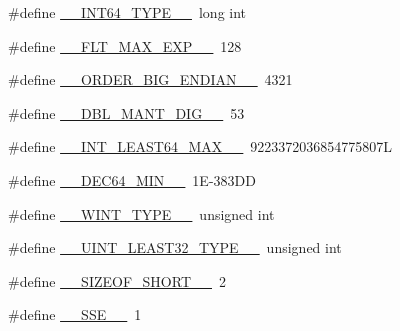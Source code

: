 \begin{DoxyCompactItemize}
\item 
\#define \hyperlink{build-analizer__host-_desktop___qt__5__9__0___g_c_c__64bit-_release_2moc__predefs_8h_a690dd4c0c7711687e30418f5e988d842}{\+\_\+\+\_\+\+I\+N\+T64\+\_\+\+T\+Y\+P\+E\+\_\+\+\_\+}~long int
\item 
\#define \hyperlink{build-analizer__host-_desktop___qt__5__9__0___g_c_c__64bit-_release_2moc__predefs_8h_abd1effb8f681ce210223aceb08d8ed33}{\+\_\+\+\_\+\+F\+L\+T\+\_\+\+M\+A\+X\+\_\+\+E\+X\+P\+\_\+\+\_\+}~128
\item 
\#define \hyperlink{build-analizer__host-_desktop___qt__5__9__0___g_c_c__64bit-_release_2moc__predefs_8h_a190d0219caabccc0e05909f39bcb00d6}{\+\_\+\+\_\+\+O\+R\+D\+E\+R\+\_\+\+B\+I\+G\+\_\+\+E\+N\+D\+I\+A\+N\+\_\+\+\_\+}~4321
\item 
\#define \hyperlink{build-analizer__host-_desktop___qt__5__9__0___g_c_c__64bit-_release_2moc__predefs_8h_ae8f0035094061d550323c738b8d67601}{\+\_\+\+\_\+\+D\+B\+L\+\_\+\+M\+A\+N\+T\+\_\+\+D\+I\+G\+\_\+\+\_\+}~53
\item 
\#define \hyperlink{build-analizer__host-_desktop___qt__5__9__0___g_c_c__64bit-_release_2moc__predefs_8h_ac8ff7f5492853e7e2fa19ebb2b98c9bc}{\+\_\+\+\_\+\+I\+N\+T\+\_\+\+L\+E\+A\+S\+T64\+\_\+\+M\+A\+X\+\_\+\+\_\+}~9223372036854775807\+L
\item 
\#define \hyperlink{build-analizer__host-_desktop___qt__5__9__0___g_c_c__64bit-_release_2moc__predefs_8h_abd66733cff0ce1656bb7e744aa151bea}{\+\_\+\+\_\+\+D\+E\+C64\+\_\+\+M\+I\+N\+\_\+\+\_\+}~1\+E-\/383\+D\+D
\item 
\#define \hyperlink{build-analizer__host-_desktop___qt__5__9__0___g_c_c__64bit-_release_2moc__predefs_8h_a1304d54dba90274495e0b09c9820927b}{\+\_\+\+\_\+\+W\+I\+N\+T\+\_\+\+T\+Y\+P\+E\+\_\+\+\_\+}~unsigned int
\item 
\#define \hyperlink{build-analizer__host-_desktop___qt__5__9__0___g_c_c__64bit-_release_2moc__predefs_8h_a76363f8817bf3df4542ebbcce172df53}{\+\_\+\+\_\+\+U\+I\+N\+T\+\_\+\+L\+E\+A\+S\+T32\+\_\+\+T\+Y\+P\+E\+\_\+\+\_\+}~unsigned int
\item 
\#define \hyperlink{build-analizer__host-_desktop___qt__5__9__0___g_c_c__64bit-_release_2moc__predefs_8h_ae9ea889821e3c2486a7435a83a309e80}{\+\_\+\+\_\+\+S\+I\+Z\+E\+O\+F\+\_\+\+S\+H\+O\+R\+T\+\_\+\+\_\+}~2
\item 
\#define \hyperlink{build-analizer__host-_desktop___qt__5__9__0___g_c_c__64bit-_release_2moc__predefs_8h_a7f85a85bc12e5cc7526909a91780f70a}{\+\_\+\+\_\+\+S\+S\+E\+\_\+\+\_\+}~1
\item 

\end{DoxyCompactItemize}

